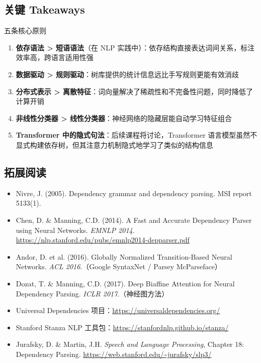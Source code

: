 \documentclass[a4paper]{article}
\begin{document}
\subsection{关键 Takeaways}

\begin{importantbox}{五条核心原则}
\begin{enumerate}
    \item \textbf{依存语法 > 短语语法}（在 NLP 实践中）：依存结构直接表达词间关系，标注效率高，跨语言适用性强
    \item \textbf{数据驱动 > 规则驱动}：树库提供的统计信息远比手写规则更能有效消歧
    \item \textbf{分布式表示 > 离散特征}：词向量解决了稀疏性和不完备性问题，同时降低了计算开销
    \item \textbf{非线性分类器 > 线性分类器}：神经网络的隐藏层能自动学习特征组合
    \item \textbf{Transformer 中的隐式句法}：后续课程将讨论，Transformer 语言模型虽然不显式构建依存树，但其注意力机制隐式地学习了类似的结构信息
\end{enumerate}
\end{importantbox}

\subsection{拓展阅读}

\begin{itemize}
    \item Nivre, J. (2005). Dependency grammar and dependency parsing. MSI report 5133(1).
    \item Chen, D. \& Manning, C.D. (2014). A Fast and Accurate Dependency Parser using Neural Networks. \textit{EMNLP 2014}. \url{https://nlp.stanford.edu/pubs/emnlp2014-depparser.pdf}
    \item Andor, D. et al. (2016). Globally Normalized Transition-Based Neural Networks. \textit{ACL 2016}.（Google SyntaxNet / Parsey McParseface）
    \item Dozat, T. \& Manning, C.D. (2017). Deep Biaffine Attention for Neural Dependency Parsing. \textit{ICLR 2017}.（神经图方法）
    \item Universal Dependencies 项目：\url{https://universaldependencies.org/}
    \item Stanford Stanza NLP 工具包：\url{https://stanfordnlp.github.io/stanza/}
    \item Jurafsky, D. \& Martin, J.H. \textit{Speech and Language Processing}, Chapter 18: Dependency Parsing. \url{https://web.stanford.edu/~jurafsky/slp3/}
\end{itemize}
\end{document}
